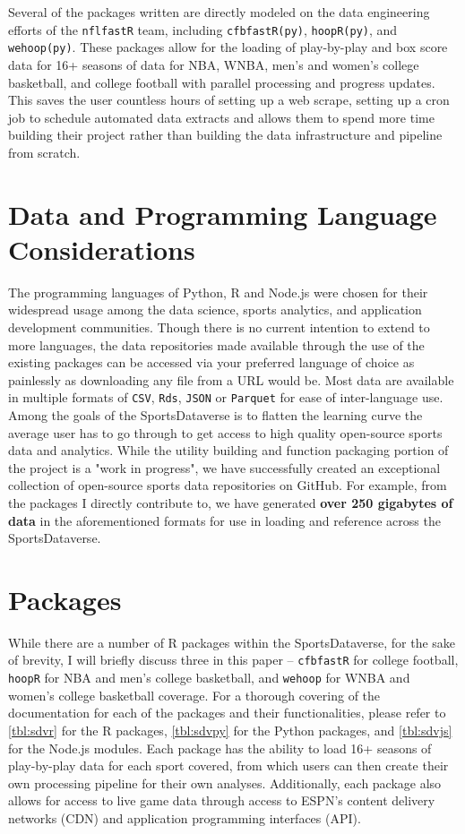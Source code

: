 \documentclass[12pt]{article}
\begin{document}
Several of the packages written are directly modeled on the data engineering efforts of the \texttt{nflfastR} team, including \texttt{cfbfastR(py)}\cite{gilani_etal_cfbfastr_2021}\cite{gilani_cfbfastRpy_2021}, \texttt{hoopR(py)}\cite{gilani_hoopR_2021}\cite{gilani_hoopRpy_2021}, and \texttt{wehoop(py)}\cite{hutchingson_gilani_2021}\cite{gilani_wehooppy_2021}. These packages allow for the loading of play-by-play and box score data for 16+ seasons of data for NBA, WNBA, men's and women's college basketball, and college football with parallel processing and progress updates. This saves the user countless hours of setting up a web scrape, setting up a cron job to schedule automated data extracts and allows them to spend more time building their project rather than building the data infrastructure and pipeline from scratch.  

\section{Data and Programming Language Considerations}
The programming languages of Python, R and Node.js were chosen for their widespread usage among the data science, sports analytics, and application development communities. Though there is no current intention to extend to more languages, the data repositories made available through the use of the existing packages can be accessed via your preferred language of choice as painlessly as downloading any file from a URL would be. Most data are available in multiple formats of \texttt{CSV}, \texttt{Rds}, \texttt{JSON} or \texttt{Parquet} for ease of inter-language use. Among the goals of the SportsDataverse is to flatten the learning curve the average user has to go through to get access to high quality open-source sports data and analytics. While the utility building and function packaging portion of the project is a "work in progress", we have successfully created an exceptional collection of open-source sports data repositories on GitHub. For example, from the packages I directly contribute to, we have generated \textbf{over 250 gigabytes of data} in the aforementioned formats for use in loading and reference across the SportsDataverse. 

\section{Packages}
While there are a number of R packages within the SportsDataverse, for the sake of brevity, I will briefly discuss three in this paper -- \texttt{cfbfastR} for college football, \texttt{hoopR} for NBA and men's college basketball, and \texttt{wehoop} for WNBA and women's college basketball coverage. For a thorough covering of the documentation for each of the packages and their functionalities, please refer to \ref{tbl:sdvr} for the R packages, \ref{tbl:sdvpy} for the Python packages, and \ref{tbl:sdvjs} for the Node.js modules. Each package has the ability to load 16+ seasons of play-by-play data for each sport covered, from which users can then create their own processing pipeline for their own analyses. Additionally, each package also allows for access to live game data through access to ESPN's content delivery networks (CDN) and application programming interfaces (API). 
\end{document}
